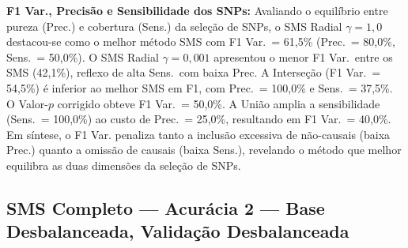 \documentclass[12pt,a4paper]{article}
\newcommand{\novo}[1]{\textcolor{corNova}{#1}}
\begin{document}
\novo{\textbf{F1 Var., Precisão e Sensibilidade dos SNPs:} Avaliando o equilíbrio entre pureza (Prec.) e cobertura (Sens.) da seleção de SNPs, o SMS Radial $\gamma=1{,}0$ destacou-se como o melhor método SMS com F1 Var.\ = 61,5\% (Prec.\ = 80,0\%, Sens.\ = 50,0\%). O SMS Radial $\gamma=0{,}001$ apresentou o menor F1 Var.\ entre os SMS (42,1\%), reflexo de alta Sens.\ com baixa Prec. A Interseção (F1 Var.\ = 54,5\%) é inferior ao melhor SMS em F1, com Prec.\ = 100,0\% e Sens.\ = 37,5\%. O Valor-$p$ corrigido obteve F1 Var.\ = 50,0\%. A União amplia a sensibilidade (Sens.\ = 100,0\%) ao custo de Prec.\ = 25,0\%, resultando em F1 Var.\ = 40,0\%. Em síntese, o F1 Var. penaliza tanto a inclusão excessiva de não-causais (baixa Prec.) quanto a omissão de causais (baixa Sens.), revelando o método que melhor equilibra as duas dimensões da seleção de SNPs.}
\subsection{SMS Completo --- Acurácia 2 --- Base Desbalanceada, Validação Desbalanceada}
\end{document}

